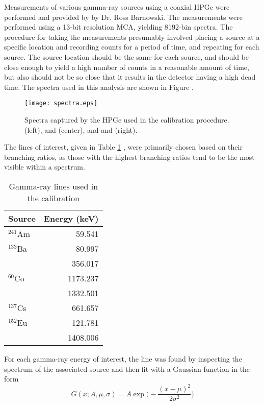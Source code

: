 Measurements of various gamma-ray sources using a coaxial HPGe were performed and provided by by Dr. Ross Barnowski.
The measurements were performed using a 13-bit resolution MCA, yielding 8192-bin spectra.
The procedure for taking the measurements presumably involved placing a source at a specific location and recording counts for a period of time, and repeating for each source.
The source location should be the same for each source, and should be close enough to yield a high number of counts in a reasonable amount of time, but also should not be so close that it results in the detector having a high dead time.
The spectra used in this analysis are shown in Figure \label{fig:spectra}.

\begin{figure*}[!t]
\centering
\texttt{[image: spectra.eps]}
\caption{Spectra captured by the HPGe used in the calibration procedure.  (left),  and  (center), and  and  (right).}
\label{fig:spectra}
\end{figure*}

The lines of interest, given in Table \ref{tab:src} \cite{lund}, were primarily chosen based on their branching ratios, as those with the highest branching ratios tend to be the most visible within a spectrum.

\begin{table}[!t]
\renewcommand{\arraystretch}{1.3}
\caption{Gamma-ray lines used in the calibration}
\label{tab:src}
\centering
\begin{tabular}{l|r}
\hline
\bfseries Source & \bfseries Energy (keV)\\
\hline\hline
      $^{241}$Am    &  59.541    \\
      $^{133}$Ba    &  80.997    \\
                    &  356.017   \\
      $^{60}$Co     &  1173.237  \\
                    &  1332.501  \\
      $^{137}$Cs    &  661.657   \\
      $^{152}$Eu    &  121.781   \\
                    &  1408.006  \\
\hline
\end{tabular}
\end{table}

For each gamma-ray energy of interest, the line was found by inspecting the spectrum of the associated source and then fit with a Gaussian function in the form
\begin{equation}
G(x; A, \mu, \sigma) = A\exp\bigg(-\frac{(x-\mu)^2}{2\sigma^2}\bigg)
\end{equation}


